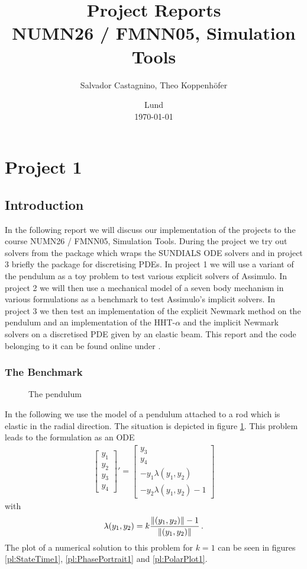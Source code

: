 \documentclass{report}
\title{ Project Reports \\[1ex]
	  \large NUMN26 / FMNN05, Simulation Tools}
\author{Salvador Castagnino, Theo Koppenhöfer}
\date{Lund \\[1ex] \today}
\DeclarePairedDelimiter{\norm}{\lVert}{\rVert}
\newcommand{\vect}[1]{\begin{bmatrix} #1 \end{bmatrix}}
\begin{document}
\maketitle

\chapter*{Project 1}

\section*{Introduction}

In the following report we will discuss our implementation of the projects to the course NUMN26 / FMNN05, Simulation Tools. During the project we try out solvers from the  package which wraps the SUNDIALS ODE solvers and in project 3 briefly the  package for discretising PDEs. In project 1 we will use a variant of the pendulum as a toy problem to test various explicit solvers of Assimulo. In project 2 we will then use a mechanical model of a seven body mechanism in various formulations as a benchmark to test Assimulo's implicit solvers. In project 3 we then test an implementation of the explicit Newmark method on the pendulum and an implementation of the HHT-$\alpha$ and the implicit Newmark solvers on a discretised PDE given by an elastic beam.
This report and the code belonging to it can be found online under \cite{Repository}.

\subsection*{The Benchmark}


\begin{figure}
\centering

\caption{The pendulum}
\label{dr:Pendulum}
\vspace*{-1cm}
\end{figure}

In the following we use the model of a pendulum attached to a rod which is elastic in the radial direction. The situation is depicted in figure \ref{dr:Pendulum}.
This problem leads to the formulation as an ODE
\begin{align*}
	\vect{y_1 \\ y_2 \\ y_3 \\ y_4}' = \vect{y_3 \\ y_4 \\ -y_1\lambda(y_1,y_2) \\ -y_2\lambda(y_1,y_2)-1}
\end{align*}
with
\begin{align*}
	\lambda(y_1,y_2)=k\frac{\norm{(y_1,y_2)}-1}{\norm{(y_1,y_2)}}\,.
\end{align*}
The plot of a numerical solution to this problem for $k=1$ can be seen in figures \ref{pl:StateTime1}, \ref{pl:PhasePortrait1} and \ref{pl:PolarPlot1}.
\end{document}
